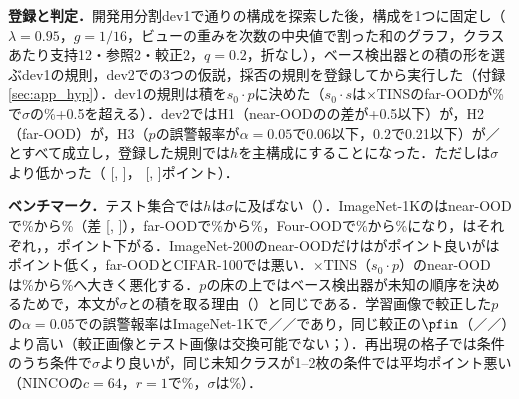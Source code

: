\textbf{登録と判定．}開発用分割dev1で\NHsExplNCfg{}通りの構成を探索した後，構成を1つに固定し（$\lambda{=}0.95$，$g{=}1/16$，ビューの重みを次数の中央値で割った和のグラフ，クラスあたり支持12・参照2・較正2，$q{=}0.2$，折なし），ベース検出器との積の形を選ぶdev1の規則，dev2での3つの仮説，採否の規則を登録してから実行した（付録\ref{sec:app_hyp}）．dev1の規則は積を$s_0\cdot p$に決めた（$s_0\cdot s$は$\times$TINSのfar-OODが\NHsDevOneTinsFarS\%で$\sigma$の\NHsDevOneTinsSigFar\%+0.5を超える）．dev2ではH1（near-OODの\FPR{}の差が+0.5以下）が\NHsDevTwoNearD{}，H2（far-OOD）が\NHsDevTwoFarD{}，H3（$p$の誤警報率が$\alpha{=}0.05$で0.06以下，$0.2$で0.21以下）が\NHsDevTwoFprFive{}／\NHsDevTwoFprTwenty{}とすべて成立し，登録した規則では$h$を主構成にすることになった．ただし\AUC{}は$\sigma$より低かった（\NHsDevTwoNearDAuc{} [\NHsDevTwoNearDAucLo, \NHsDevTwoNearDAucHi]，\NHsDevTwoFarDAuc{} [\NHsDevTwoFarDAucLo, \NHsDevTwoFarDAucHi]ポイント）．

\begin{table}[htbp]
\centering
\caption{一つの量$h$（登録した構成）と本文の$\sigma$（単体，ベンチマークは6通りの抽出の平均，dev2は5通り；差は$h-\sigma$，抽出を単位とする対応のある95\% $t$区間）．$\times$TINSの$h$はdev1の規則で選んだ$s_0\cdot p$．}
\label{tab:h16}
\vspace{1.5mm}

\end{table}

\textbf{ベンチマーク．}テスト集合では$h$は$\sigma$に及ばない（）．ImageNet-1Kの\FPR{}はnear-OODで\NHsTestNearSigFpr\%から\NHsTestNearFpr\%（差\NHsTestNearD{} [\NHsTestNearLo, \NHsTestNearHi]），far-OODで\NHsTestFarSigFpr\%から\NHsTestFarFpr\%，Four-OODで\NHsTestFourSigFpr\%から\NHsTestFourFpr\%になり，\AUC{}はそれぞれ\NHsTestNearDAuc{}，\NHsTestFarDAuc{}，\NHsTestFourDAuc{}ポイント下がる．ImageNet-200のnear-OODだけは\FPR{}が\NHsInTwoHundredNearD{}ポイント良いが\AUC{}は\NHsInTwoHundredNearDAuc{}ポイント低く，far-OODとCIFAR-100では悪い．$\times$TINS（$s_0\cdot p$）のnear-OODは\NHsTestNearTinsSigFpr\%から\NHsTestNearTinsFpr\%へ大きく悪化する．$p$の床の上ではベース検出器が未知の順序を決めるためで，本文が$\sigma$との積を取る理由（）と同じである．学習画像で較正した$p$の$\alpha{=}0.05$での誤警報率はImageNet-1Kで\NHsTestNearValFive{}／\NHsTestFarValFive{}／\NHsTestFourValFive{}であり，同じ較正の$\pfin$（\NHsTestNearSigValFive{}／\NHsTestFarSigValFive{}／\NHsTestFourSigValFive）より高い（較正画像とテスト画像は交換可能でない；）．再出現の格子では\NHsRecNCells{}条件のうち\NHsRecNBetter{}条件で$\sigma$より良いが，同じ未知クラスが1--2枚の\NHsRecNSingleton{}条件では平均\NHsRecSingletonMeanD{}ポイント悪い（NINCOの$c{=}64$，$r{=}1$で\NHsRecNincoCSixtyFourROne\%，$\sigma$は\NHsRecNincoCSixtyFourROneSig\%）．

